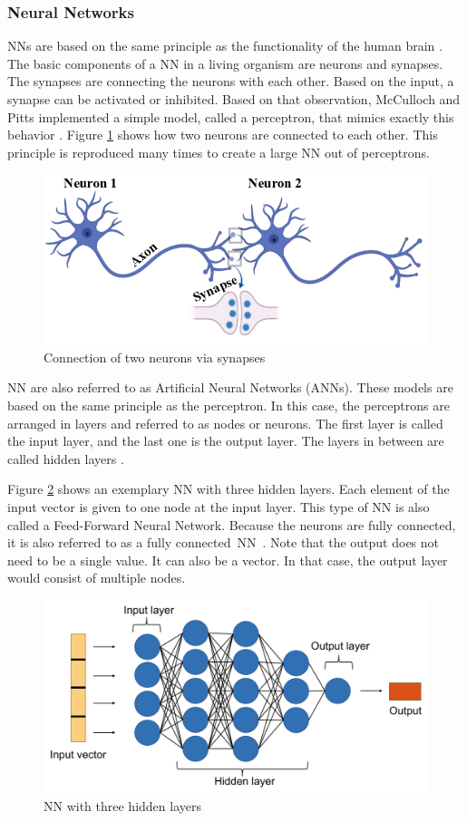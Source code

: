 \subsubsection*{Neural Networks}\label{NN chapter}
NNs are based on the same principle as the functionality of the human brain \cite{Janiesch}.
The basic components of a NN in a living organism are neurons and synapses. The synapses are connecting the neurons with each other. Based on the input, a synapse can be activated or inhibited. Based on that observation, McCulloch and Pitts implemented a simple model, called a perceptron, that mimics exactly this behavior \cite{Theodoridis}.
Figure \ref{fig:2nn} shows how two neurons are connected to each other. This principle is reproduced many times to create a large NN out of perceptrons.
\begin{figure}[H]
	\centering
	\includegraphics[width=0.8\linewidth]{IMGs/2NN.png}
	\caption{Connection of two neurons via synapses \cite{Das}}
	\label{fig:2nn}
\end{figure}

\newpage
NN are also referred to as Artificial Neural Networks (ANNs). These models are based on the same principle as the perceptron. In this case, the perceptrons are arranged in layers and referred to as nodes or neurons. The first layer is called the input layer, and the last one is the output layer. The layers in between are called hidden layers \cite{JOOST}. 

Figure \ref{fig:NN1} shows an exemplary NN with three hidden layers. Each element of the input vector is given to one node at the input layer. This type of NN is also called a Feed-Forward Neural Network. Because the neurons are fully connected, it is also referred to as a fully connected~NN~\cite{Sainath}. Note that the output does not need to be a single value. It can also be a vector. In that case, the output layer would consist of multiple nodes.

\begin{figure}[H]
	\centering
	\includegraphics[width=0.8\linewidth]{IMGs/NN1.png}
	\caption{NN with three hidden layers}
	\label{fig:NN1}
\end{figure}
 
